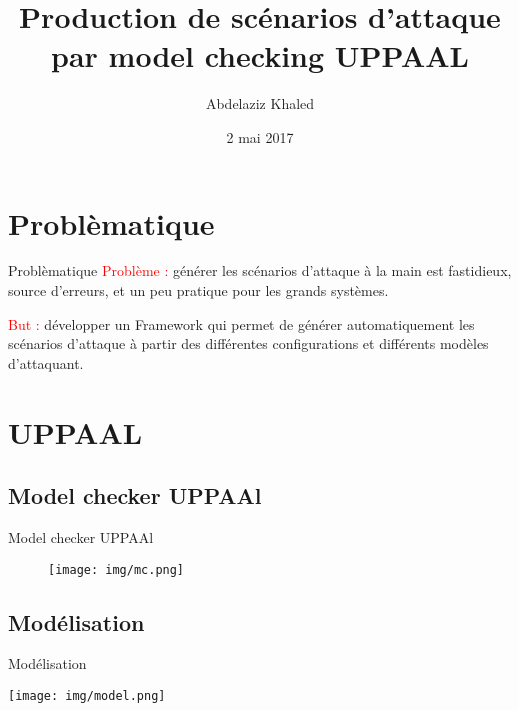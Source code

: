 \documentclass[11pt]{beamer}
\author{Abdelaziz Khaled}
\title{Production de scénarios d'attaque par model checking UPPAAL}
\date{2 mai 2017}
\begin{document}
\begin{frame}
\titlepage
\end{frame}

\section{Problèmatique}
\begin{frame}{Problèmatique}
\textcolor{red}{Problème : } générer les scénarios d'attaque à la main est fastidieux, source d'erreurs, et un peu pratique pour les grands systèmes.
\medskip \medskip
\pause
\medskip

\textcolor{red}{But : } développer un Framework qui permet de générer automatiquement les scénarios d'attaque à partir des différentes configurations et différents modèles d'attaquant.
\end{frame}

\section{UPPAAL}
\subsection{Model checker UPPAAl}
\begin{frame}{Model checker UPPAAl}
\begin{center}
\begin{figure}
\texttt{[image: img/mc.png]}
\end{figure}
\end{center}
\end{frame}

\subsection{Modélisation}

\begin{frame}{Modélisation}
\begin{center}
\texttt{[image: img/model.png]} 
\end{center}
\end{frame}
\end{document}
